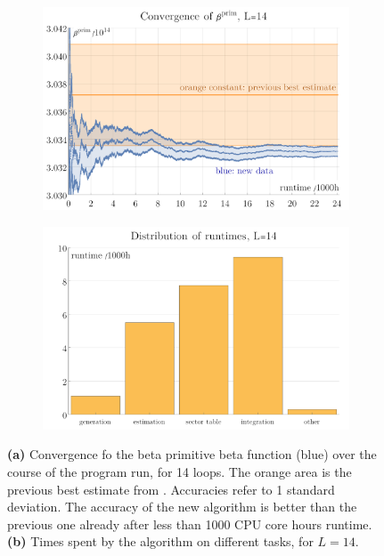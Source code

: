 \documentclass[12pt]{article}
\numberwithin{equation}{section}
\begin{document}
\begin{figure}[htb]
	
	\begin{subfigure}{ .49 \linewidth}
		\centering
		\includegraphics[width=\linewidth]{figures/beta14_convergence}
		\subcaption{}
		\label{fig:beta14_convergence}
	\end{subfigure}
	\begin{subfigure}{ .49 \linewidth}
		\centering
		\includegraphics[width=\linewidth]{figures/beta14_runtimes}
		\subcaption{}
		\label{fig:beta14_runtimes}
	\end{subfigure}
	\caption{ 
		\textbf{(a)}  Convergence fo the beta primitive beta function (blue) over the course of the program run, for 14 loops. The orange area is the previous best estimate from \cite{balduf_statistics_2023}. Accuracies refer to 1 standard deviation.  The accuracy of the new algorithm is better than the previous one already after less than 1000 CPU core hours runtime. 
		\textbf{(b)} Times spent by the algorithm on different tasks, for $L=14$.  }
	
\end{figure}
\end{document}
